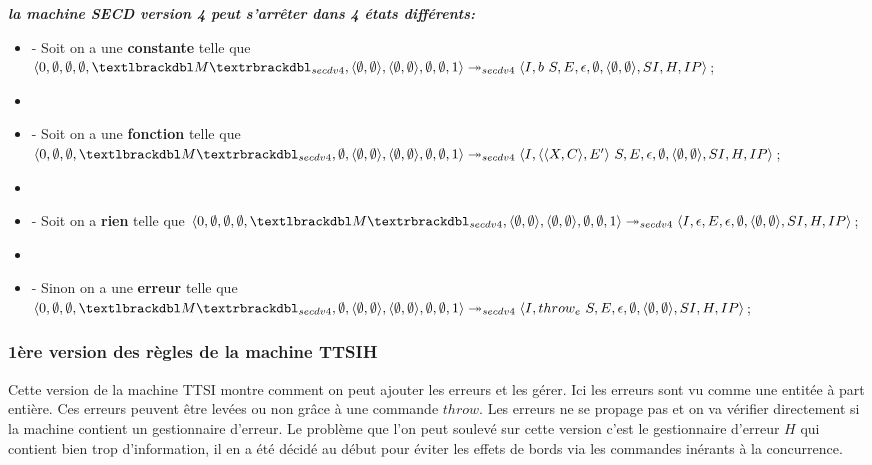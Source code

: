 \documentclass[10pt,a4paper]{report}
\begin{document}
	
	\textbf{\textit{la machine SECD version 4 peut s'arrêter dans 4 états différents:}}
	\smallbreak
	\begin{itemize}
		\item[] - Soit on a une \textbf{constante} telle que $\langle 0,\emptyset,\emptyset,\emptyset,\textlbrackdbl M\textrbrackdbl_{secdv4},\langle\emptyset,\emptyset\rangle,\langle\emptyset,\emptyset\rangle,\emptyset,\emptyset,1\rangle \\
		\twoheadrightarrow_{secdv4} \langle I,b~S,E,\epsilon,\emptyset,\langle\emptyset,\emptyset\rangle,SI,H,IP\rangle$;
		\item[] 
		\item[] - Soit on a une \textbf{fonction} telle que
		$\langle 0,\emptyset,\emptyset,\textlbrackdbl M\textrbrackdbl_{secdv4},\emptyset,\langle\emptyset,\emptyset\rangle,\langle\emptyset,\emptyset\rangle,\emptyset,\emptyset,1\rangle \\
		\twoheadrightarrow_{secdv4} \langle I,\langle\langle X,C\rangle,E'\rangle~S,E,\epsilon,\emptyset,\langle\emptyset,\emptyset\rangle,SI,H,IP\rangle$;
		\item[] 
		\item[] - Soit on a \textbf{rien} telle que $\langle 0,\emptyset,\emptyset,\emptyset,\textlbrackdbl M\textrbrackdbl_{secdv4},\langle\emptyset,\emptyset\rangle,\langle\emptyset,\emptyset\rangle,\emptyset,\emptyset,1\rangle \\
		\twoheadrightarrow_{secdv4} \langle I,\epsilon,E,\epsilon,\emptyset,\langle\emptyset,\emptyset\rangle,SI,H,IP\rangle$;
		\item[] 
		\item[] - Sinon on a une \textbf{erreur} telle que 
		$\langle 0,\emptyset,\emptyset,\textlbrackdbl M\textrbrackdbl_{secdv4},\emptyset,\langle\emptyset,\emptyset\rangle,\langle\emptyset,\emptyset\rangle,\emptyset,\emptyset,1\rangle \\
		\twoheadrightarrow_{secdv4} \langle I,throw_{e}~S,E,\epsilon,\emptyset,\langle\emptyset,\emptyset\rangle,SI,H,IP\rangle$;
	\end{itemize}
	\newpage
	
	\subsubsection{1ère version des règles de la machine TTSIH}\label{TTSI1}
	 	Cette version de la machine TTSI montre comment on peut ajouter les erreurs et les gérer. Ici les erreurs sont vu comme une entitée à part entière. Ces erreurs peuvent être levées ou non grâce à une commande $throw$. Les erreurs ne se propage pas et on va vérifier directement si la machine contient un gestionnaire d'erreur. Le problème que l'on peut soulevé sur cette version c'est le gestionnaire d'erreur $H$ qui contient bien trop d'information, il en a été décidé au début pour éviter les effets de bords via les commandes inérants à la concurrence.
	\bigbreak
	
\end{document}
